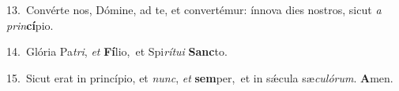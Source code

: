 {\numbfont\textcolor{\numbcolor}{13.}}~Convérte nos, Dómine, ad te, et convertémur: ínnova dies nostros, sicut \textit{a} \textit{prin}\-\textbf{cí}pio.\par
{\numbfont\textcolor{\numbcolor}{14.}}~Glória Pa\-\textit{tri}\-, \textit{et} \textbf{Fí}\-lio,~\star et Spi\-\textit{rí}\-\textit{tu}\textit{i} \textbf{Sanc}\-to.\par
{\numbfont\textcolor{\numbcolor}{15.}}~Sicut erat in princípio, et \textit{nunc}\-, \textit{et} \textbf{sem}\-per,~\star et in sǽcula sæ\-\textit{cu}\-\textit{ló}\textit{rum}. \textbf{A}\-men.\par

